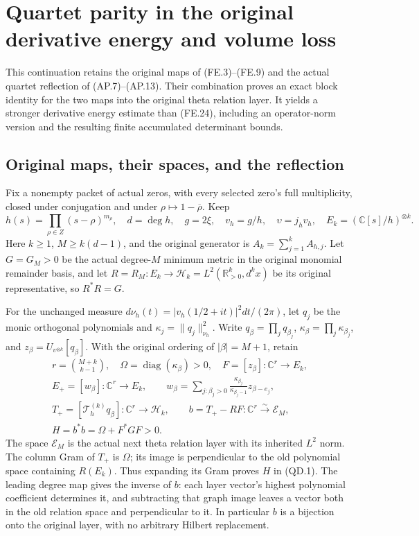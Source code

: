 \section{Quartet parity in the original derivative energy and volume loss}
\label{sec:quartet-dissipation-continuation}

This continuation retains the original maps of (FE.3)--(FE.9)
and the actual quartet reflection of (AP.7)--(AP.13).  Their
combination proves an exact block identity for the two maps into
the original theta relation layer.  It yields a stronger derivative
energy estimate than (FE.24), including an operator-norm version
and the resulting finite accumulated determinant bounds.

\subsection{Original maps, their spaces, and the reflection}

Fix a nonempty packet of actual zeros, with every selected zero's
full multiplicity, closed under conjugation and under
\(\rho\mapsto1-\overline\rho\).  Keep
\[
 h(s)=\prod_{\rho\in Z}(s-\rho)^{m_\rho},\quad d=\deg h,
 \quad g=2\xi,\quad v_h=g/h,\quad
 \upsilon=j_hv_h,\quad E_k=(\mathbb C[s]/h)^{\otimes k}.
\]
Here \(k\geq1\), \(M\geq k(d-1)\), and the original
generator is \(A_k=\sum_{j=1}^kA_{h,j}\).  Let \(G=G_M>0\)
be the actual degree-\(M\) minimum metric in the original
monomial remainder basis, and let
\(R=R_M:E_k\to\mathcal H_k=L^2(\mathbb R_{>0}^k,d^kx)\)
be its original representative, so \(R^*R=G\).

For the unchanged measure
\(d\nu_h(t)=|v_h(1/2+it)|^2dt/(2\pi)\), let \(q_j\)
be the monic orthogonal polynomials and
\(\kappa_j=\|q_j\|_{\nu_h}^2\).  Write
\(q_\beta=\prod_jq_{\beta_j}\),
\(\kappa_\beta=\prod_j\kappa_{\beta_j}\), and
\(z_\beta=U_{\upsilon^{\otimes k}}[q_\beta]\).
With the original ordering of \(|\beta|=M+1\), retain
\[
 \begin{gathered}
 r=\binom{M+k}{k-1},\quad
 \Omega=\operatorname{diag}(\kappa_\beta)>0,\quad
 F=[z_\beta]:\mathbb C^r\to E_k,\\
 E_+=[w_\beta]:\mathbb C^r\to E_k,\qquad
 w_\beta=\sum_{j:\beta_j>0}
                  \frac{\kappa_{\beta_j}}{\kappa_{\beta_j-1}}
                       z_{\beta-e_j},\\
 T_+=[\mathcal T_h^{(k)}q_\beta]:\mathbb C^r\to\mathcal H_k,
 \qquad b=T_+-RF:\mathbb C^r\xrightarrow{\sim}\mathcal E_M,\\
 H=b^*b=\Omega+F^*GF>0.
 \end{gathered}                                                     \tag{QD.1}
\]
The space \(\mathcal E_M\) is the actual next theta relation
layer with its inherited \(L^2\) norm.  The column Gram of
\(T_+\) is \(\Omega\); its image is perpendicular to the old
polynomial space containing \(R(E_k)\).  Thus expanding its
Gram proves \(H\) in (QD.1).  The leading degree map gives
the inverse of \(b\): each layer vector's highest polynomial
coefficient determines it, and subtracting that graph image
leaves a vector both in the old relation space and perpendicular
to it.  In particular \(b\) is a bijection onto the original
layer, with no arbitrary Hilbert replacement.

